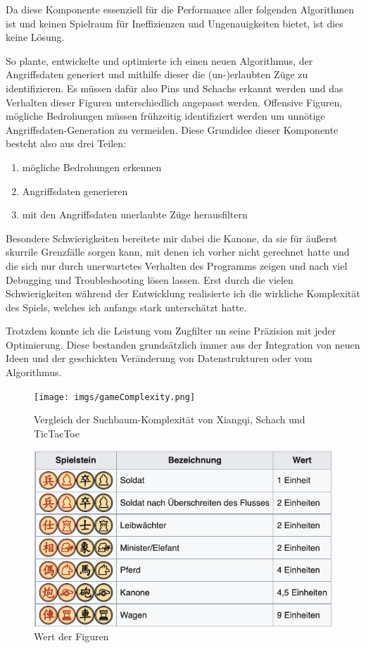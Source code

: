 \documentclass{jpp}
\begin{document}
Da diese Komponente essenziell für die Performance aller folgenden Algorithmen ist und keinen Spielraum für Ineffizienzen und Ungenauigkeiten bietet, ist dies keine Lösung.

So plante, entwickelte und optimierte ich einen neuen Algorithmus, der Angriffsdaten generiert und mithilfe dieser die (un-)erlaubten Züge zu identifizieren.
Es müssen dafür also Pins und Schachs erkannt werden und das Verhalten dieser Figuren unterschiedlich angepasst werden. Offensive Figuren, mögliche Bedrohungen müssen frühzeitig identifiziert werden um unnötige Angriffsdaten-Generation zu vermeiden.
Diese Grundidee dieser Komponente besteht also aus drei Teilen:
\begin{enumerate}
    \item mögliche Bedrohungen erkennen
    \item Angriffsdaten generieren
    \item mit den Angriffsdaten unerlaubte Züge herausfiltern
\end{enumerate}

Besondere Schwierigkeiten bereitete mir dabei die Kanone, da sie für äußerst skurrile Grenzfälle sorgen kann, mit denen ich vorher nicht gerechnet hatte und die sich nur durch unerwartetes Verhalten des Programms zeigen und nach viel Debugging und Troubleshooting lösen lassen. Erst durch die vielen Schwierigkeiten während der Entwicklung realisierte ich die wirkliche Komplexität des Spiels, welches ich anfangs stark unterschätzt hatte.

Trotzdem konnte ich die Leistung vom Zugfilter un seine Präzision mit jeder Optimierung. Diese bestanden grundsätzlich immer aus der Integration von neuen Ideen und der geschickten Veränderung von Datenstrukturen oder vom Algorithmus.

\begin{figure}
  \centering
    \begin{minipage}{0.49\textwidth}
    \texttt{[image: imgs/gameComplexity.png]}
    \caption{Vergleich der Suchbaum-Komplexität von Xiangqi, Schach und TicTacToe}
    \label{fig:gameComplexity}
  \end{minipage}
  \hfill
  \begin{minipage}{0.49\textwidth}
    \centering
    \includegraphics[width={\textwidth}]{imgs/Wert.png}
    \caption{Wert der Figuren}
    \label{fig:wert}
  \end{minipage}
\end{figure}
\end{document}
